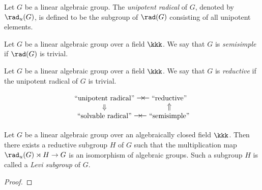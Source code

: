     \begin{definition}\label{def:nilradical_of_linear_algebraic_group}
        Let \(G\) be a linear algebraic group. 
        The \emph{unipotent radical} of \(G\), denoted by \(\rad_u(G)\), is defined to be the subgroup of \(\rad(G)\) consisting of all unipotent elements.
    \end{definition}

    \begin{definition}\label{def:semisimple_linear_algebraic_group}
        Let \(G\) be a linear algebraic group over a field \(\kkk\). 
        We say that \(G\) is \emph{semisimple} if \(\rad(G)\) is trivial.
    \end{definition}

    \begin{definition}\label{def:reductive_linear_algebraic_group}
        Let \(G\) be a linear algebraic group over a field \(\kkk\). 
        We say that \(G\) is \emph{reductive} if the unipotent radical of \(G\) is trivial.
    \end{definition}

    \begin{slogan}\label{slogan:structure_of_linear_algebraic_groups}
        \[ 
            \begin{tikzcd}[row sep=small,column sep=small]
                \text{``unipotent radical''} \arrow[r,phantom,"\rightarrow\!\leftarrow"] \arrow[d,Rightarrow]   & \text{``reductive''}  \\
                \text{``solvable radical''} \arrow[r,phantom,"\rightarrow\!\leftarrow"]                         & \text{``semisimple''} \arrow[u,Rightarrow]
            \end{tikzcd}
        \]
    \end{slogan}

    \begin{theorem}\label{thm:levi_decomposition}
        Let \(G\) be a linear algebraic group over an algebraically closed field \(\kkk\). 
        Then there exists a reductive subgroup \(H\) of \(G\) such that the multiplication map \(\rad_u(G) \rtimes H \to G\) is an isomorphism of algebraic groups.
        Such a subgroup \(H\) is called a \emph{Levi subgroup} of \(G\).
    \end{theorem}
    \begin{proof}
    \end{proof}





